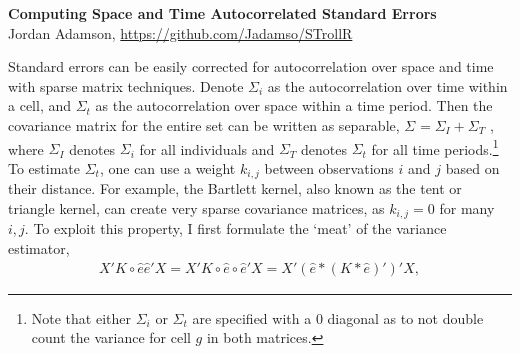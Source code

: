 \RequirePackage{ASetup}


\begin{center}
\textbf{\Large{Computing Space and Time Autocorrelated Standard Errors}}\\
Jordan Adamson, \url{https://github.com/Jadamso/STrollR}
\end{center}
Standard errors can be easily corrected for autocorrelation over space and time with sparse matrix techniques. Denote $\Sigma_{i}$ as the autocorrelation over time within a cell, and $\Sigma_{t}$ as the autocorrelation over space within a time period. Then the covariance matrix for the entire set can be written as separable,
$\Sigma_{} = \Sigma_{I} + \Sigma_{T}$
, where $\Sigma_{I}$ denotes $\Sigma_{i}$ for all individuals and $\Sigma_{T}$ denotes $\Sigma_{t}$ for all time periods.\footnote{Note that either $\Sigma_{i}$ or $\Sigma_{t}$ are specified with a $0$ diagonal as to not double count the variance for cell $g$ in both matrices.} To estimate $\Sigma_{t}$,
one can use a weight $k_{i,j}$ between observations $i$ and $j$ based on their distance. For example, the Bartlett kernel, also known as the tent or triangle kernel, can create very sparse covariance matrices, as $k_{i,j}=0$ for many $i,j$. To exploit this property, I first formulate the `meat' of the variance estimator,
\begin{eqnarray*}
X' K \circ \hat{e} \hat{e}' X
= X' K \circ  \hat{e} \circ \hat{e}' X
= X' (\hat{e} * (K * \hat{e})' )' X,
\end{eqnarray*}

